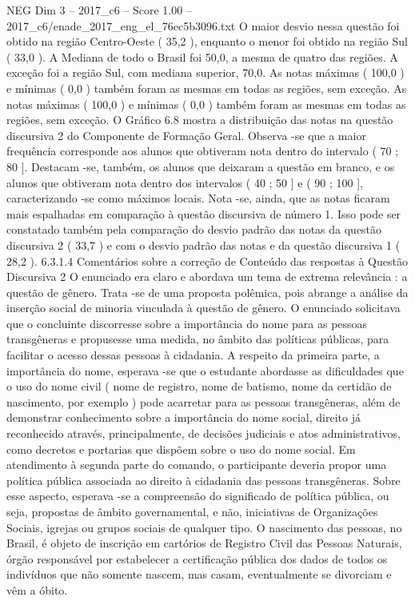 \begin{textsample}{NEG Dim 3 – 2017\_c6 – Score 1.00 – 2017\_c6/enade\_2017\_eng\_el\_76ec5b3096.txt}
O maior desvio nessa questão foi obtido na região Centro-Oeste ( 35,2 ), enquanto o menor foi obtido na região Sul ( 33,0 ).
A Mediana de todo o Brasil foi 50,0, a mesma de quatro das regiões.
A exceção foi a região Sul, com mediana superior, 70,0.
As notas máximas ( 100,0 ) e mínimas ( 0,0 ) também foram as mesmas em todas as regiões, sem exceção.
As notas máximas ( 100,0 ) e mínimas ( 0,0 ) também foram as mesmas em todas as regiões, sem exceção.
O Gráfico 6.8 mostra a distribuição das notas na questão discursiva 2 do Componente de Formação Geral.
Observa -se que a maior frequência corresponde aos alunos que obtiveram nota dentro do intervalo ( 70 ; 80 ].
Destacam -se, também, os alunos que deixaram a questão em branco, e os alunos que obtiveram nota dentro dos intervalos ( 40 ; 50 ] e ( 90 ; 100 ], caracterizando -se como máximos locais.
Nota -se, ainda, que as notas ficaram mais espalhadas em comparação à questão discursiva de número 1.
Isso pode ser constatado também pela comparação do desvio padrão das notas da questão discursiva 2 ( 33,7 ) e com o desvio padrão das notas e da questão discursiva 1 ( 28,2 ). 6.3.1.4 Comentários sobre a correção de Conteúdo das respostas à Questão Discursiva 2 O enunciado era claro e abordava um tema de extrema relevância : a questão de gênero.
Trata -se de uma proposta polêmica, pois abrange a análise da inserção social de minoria vinculada à questão de gênero.
O enunciado solicitava que o concluinte discorresse sobre a importância do nome para as pessoas transgêneras e propusesse uma medida, no âmbito das políticas públicas, para facilitar o acesso dessas pessoas à cidadania.
A respeito da primeira parte, a importância do nome, esperava -se que o estudante abordasse as dificuldades que o uso do nome civil ( nome de registro, nome de batismo, nome da certidão de nascimento, por exemplo ) pode acarretar para as pessoas transgêneras, além de demonstrar conhecimento sobre a importância do nome social, direito já reconhecido através, principalmente, de decisões judiciais e atos administrativos, como decretos e portarias que dispõem sobre o uso do nome social.
Em atendimento à segunda parte do comando, o participante deveria propor uma política pública associada ao direito à cidadania das pessoas transgêneras.
Sobre esse aspecto, esperava -se a compreensão do significado de política pública, ou seja, propostas de âmbito governamental, e não, iniciativas de Organizações Sociais, igrejas ou grupos sociais de qualquer tipo.
O nascimento das pessoas, no Brasil, é objeto de inscrição em cartórios de Registro Civil das Pessoas Naturais, órgão responsável por estabelecer a certificação pública dos dados de todos os indivíduos que não somente nascem, mas casam, eventualmente se divorciam e vêm a óbito.

\end{textsample}
